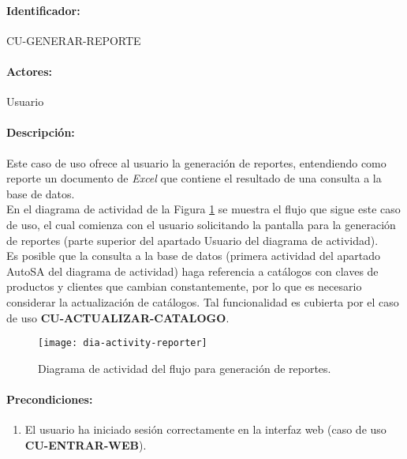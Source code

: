 \paragraph{Identificador:}
CU-GENERAR-REPORTE
\paragraph{Actores:}
Usuario
\paragraph{Descripción:}
Este caso de uso ofrece al usuario la generación de reportes, entendiendo como reporte un documento de \textit{Excel}\textsuperscript{\textcopyright} que contiene el resultado de una consulta a la base de datos.\\
En el diagrama de actividad de la Figura \ref{fig:dia-activity-reporter} se muestra el flujo que sigue este caso de uso, el cual comienza con el usuario solicitando la pantalla para la generación de reportes (parte superior del apartado Usuario del diagrama de actividad).\\
Es posible que la consulta a la base de datos (primera actividad del apartado AutoSA del diagrama de actividad) haga referencia a catálogos con claves de productos y clientes que cambian constantemente, por lo que es necesario considerar la actualización de catálogos. Tal funcionalidad es cubierta por el caso de uso \textbf{CU-ACTUALIZAR-CATALOGO}.
\begin{figure}[h]
  \centering
  \texttt{[image: dia-activity-reporter]}
  \caption{Diagrama de actividad del flujo para generación de reportes.}
  \label{fig:dia-activity-reporter}
\end{figure}
\pagebreak
\paragraph{Precondiciones:}
\begin{enumerate}
  \item El usuario ha iniciado sesión correctamente en la interfaz web (caso de uso \textbf{CU-ENTRAR-WEB}).
\end{enumerate}
